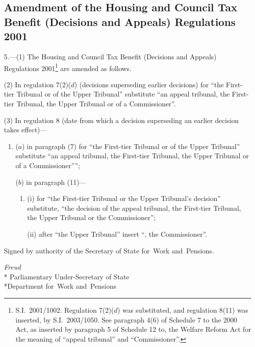 \documentclass[12pt,a4paper]{article}
\begin{document}
\subsection[5. Amendment of the Housing and Council Tax Benefit (Decisions and Appeals) Regulations 2001]{Amendment of the Housing and Council Tax Benefit (Decisions and Appeals) Regulations 2001}

5.---(1)  The Housing and Council Tax Benefit (Decisions and Appeals) Regulations 2001\footnote{S.I.~2001/1002. Regulation 7(2)($d$)  was substituted, and regulation 8(11) was inserted, by S.I.~2003/1050. See paragraph 4(6) of Schedule 7 to the 2000 Act, as inserted by paragraph 5 of Schedule 12 to, the Welfare Reform Act for the meaning of “appeal tribunal” and “Commissioner”.} are amended as follows.

(2) In regulation 7(2)($d$)  (decisions superseding earlier decisions) for “the First-tier Tribunal or of the Upper Tribunal” substitute “an appeal tribunal, the First-tier Tribunal, the Upper Tribunal or of a Commissioner”.

(3) In regulation 8 (date from which a decision superseding an earlier decision takes effect)—
\begin{enumerate}\item[]
($a$) in paragraph (7) for “the First-tier Tribunal or of the Upper Tribunal” substitute “an appeal tribunal, the First-tier Tribunal, the Upper Tribunal or of a Commissioner””;

($b$) in paragraph (11)—
\begin{enumerate}\item[]
(i) for “the First-tier Tribunal or the Upper Tribunal’s decision” substitute, “the decision of the appeal tribunal, the First-tier Tribunal, the Upper Tribunal or the Commissioner”;

(ii) after “the Upper Tribunal” insert “, the Commissioner”.
\end{enumerate}
\end{enumerate}

\bigskip

\pagebreak[3]

Signed 
by authority of the 
Secretary of State for~Work and~Pensions.

{\raggedleft
\emph{Freud}\\*
Parliamentary Under-Secretary 
of State\\*Department 
for~Work and~Pensions

}
\end{document}
